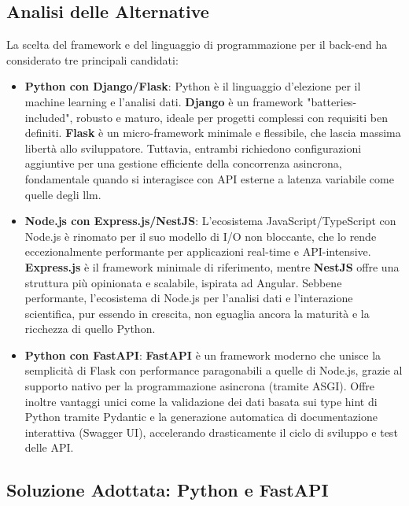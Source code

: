 \subsection{Analisi delle Alternative}

La scelta del framework e del linguaggio di programmazione per il back-end ha considerato tre principali candidati:

\begin{itemize}
    \item \textbf{Python con Django/Flask}: Python è il linguaggio d'elezione per il machine learning e l'analisi dati. \textbf{Django} è un framework "batteries-included", robusto e maturo, ideale per progetti complessi con requisiti ben definiti. \textbf{Flask} è un micro-framework minimale e flessibile, che lascia massima libertà allo sviluppatore. Tuttavia, entrambi richiedono configurazioni aggiuntive per una gestione efficiente della concorrenza asincrona, fondamentale quando si interagisce con API esterne a latenza variabile come quelle degli \gls{llm}.
    
    \item \textbf{Node.js con Express.js/NestJS}: L'ecosistema JavaScript/TypeScript con Node.js è rinomato per il suo modello di I/O non bloccante, che lo rende eccezionalmente performante per applicazioni real-time e API-intensive. \textbf{Express.js} è il framework minimale di riferimento, mentre \textbf{NestJS} offre una struttura più opinionata e scalabile, ispirata ad Angular. Sebbene performante, l'ecosistema di Node.js per l'analisi dati e l'interazione scientifica, pur essendo in crescita, non eguaglia ancora la maturità e la ricchezza di quello Python.
    
    \item \textbf{Python con FastAPI}: \textbf{FastAPI} è un framework moderno che unisce la semplicità di Flask con performance paragonabili a quelle di Node.js, grazie al supporto nativo per la programmazione asincrona (tramite ASGI). Offre inoltre vantaggi unici come la validazione dei dati basata sui type hint di Python tramite Pydantic e la generazione automatica di documentazione interattiva (Swagger UI), accelerando drasticamente il ciclo di sviluppo e test delle API.
\end{itemize}

\subsection{Soluzione Adottata: Python e FastAPI}

